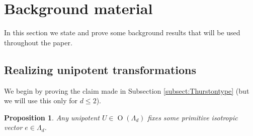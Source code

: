\documentclass[10pt,letterpaper]{amsart}
\numberwithin{equation}{section}
\newcommand\Orth{\operatorname{O}}
\newtheorem{proposition}[theorem]{Proposition}
\theoremstyle{remark}
\begin{document}
\section{Background material}

In this section we state and prove some background results that will be used throughout the paper.

\subsection{Realizing unipotent transformations}
We begin by proving the claim made in Subsection \ref{subsect:Thurstontype} (but we will use this only for $d\le 2$).



\begin{proposition}\label{prop:isotropicfixedvector}
Any  unipotent $U\in \Orth(\Lambda_d)$ fixes some primitive isotropic vector $e\in \Lambda_d$.
\end{proposition}
\end{document}
